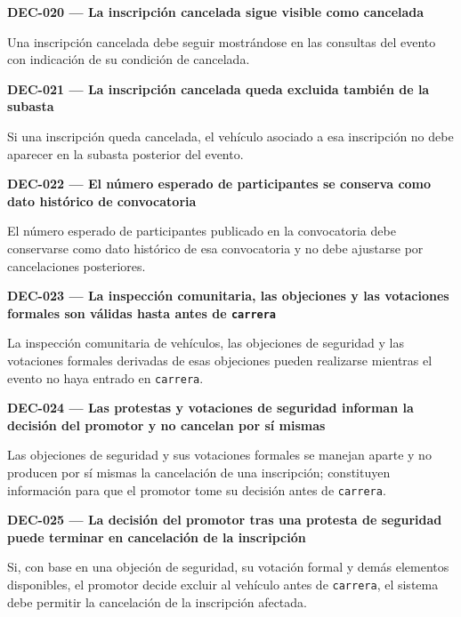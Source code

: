 \documentclass[10pt,letterpaper]{article}
\begin{document}
\noindent\textbf{DEC-020 --- La inscripción cancelada sigue visible como cancelada}\par
Una inscripción cancelada debe seguir mostrándose en las consultas del evento con indicación de su condición de cancelada.\par\vspace{0.45em}
\noindent\textbf{DEC-021 --- La inscripción cancelada queda excluida también de la subasta}\par
Si una inscripción queda cancelada, el vehículo asociado a esa inscripción no debe aparecer en la subasta posterior del evento.\par\vspace{0.45em}
\noindent\textbf{DEC-022 --- El número esperado de participantes se conserva como dato histórico de convocatoria}\par
El número esperado de participantes publicado en la convocatoria debe conservarse como dato histórico de esa convocatoria y no debe ajustarse por cancelaciones posteriores.\par\vspace{0.45em}
\noindent\textbf{DEC-023 --- La inspección comunitaria, las objeciones y las votaciones formales son válidas hasta antes de \texttt{carrera}}\par
La inspección comunitaria de vehículos, las objeciones de seguridad y las votaciones formales derivadas de esas objeciones pueden realizarse mientras el evento no haya entrado en \texttt{carrera}.\par\vspace{0.45em}
\noindent\textbf{DEC-024 --- Las protestas y votaciones de seguridad informan la decisión del promotor y no cancelan por sí mismas}\par
Las objeciones de seguridad y sus votaciones formales se manejan aparte y no producen por sí mismas la cancelación de una inscripción; constituyen información para que el promotor tome su decisión antes de \texttt{carrera}.\par\vspace{0.45em}
\noindent\textbf{DEC-025 --- La decisión del promotor tras una protesta de seguridad puede terminar en cancelación de la inscripción}\par
Si, con base en una objeción de seguridad, su votación formal y demás elementos disponibles, el promotor decide excluir al vehículo antes de \texttt{carrera}, el sistema debe permitir la cancelación de la inscripción afectada.\par\vspace{0.45em}
\end{document}

